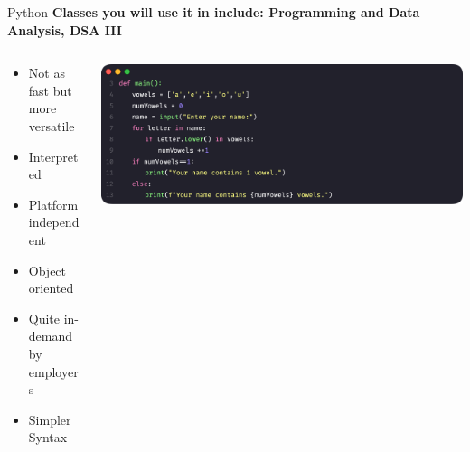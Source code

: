 \documentclass[aspectratio=169,hyperref={unicode}]{beamer}
\begin{document}
\begin{frame}{Python}
\textbf{Classes you will use it in include: Programming and Data Analysis, DSA III}

\begin{columns}
	\begin{column}{0.3\linewidth}
	\begin{itemize}
		\item Not as fast but more versatile
		\item Interpreted
		\item Platform independent
		\item Object oriented
		\item Quite in-demand by employers
		\item Simpler Syntax
	\end{itemize}
	\end{column}

	\begin{column}{0.7\linewidth}
	\begin{center}
			\includegraphics[scale=0.117]{python.png}
	\end{center}
	\end{column}
\end{columns}
\end{frame}
\end{document}
